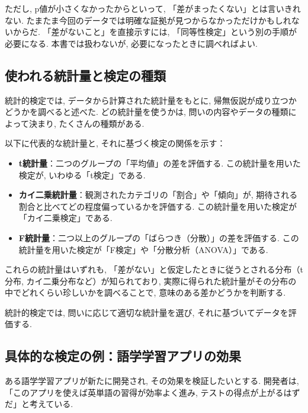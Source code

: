    ただし, p値が小さくなかったからといって, 「差がまったくない」とは言いきれない.
    たまたま今回のデータでは明確な証拠が見つからなかっただけかもしれないからだ.
    「差がないこと」を直接示すには, 「同等性検定」という別の手順が必要になる.
    本書では扱わないが, 必要になったときに調べればよい.


  \subsection{使われる統計量と検定の種類}

    統計的検定では, データから計算された統計量をもとに,
    帰無仮説が成り立つかどうかを調べると述べた.
    どの統計量を使うかは, 問いの内容やデータの種類によって決まり, たくさんの種類がある.

    以下に代表的な統計量と, それに基づく検定の関係を示す：

    \begin{itemize}
      \item \textbf{t統計量}：\quad 二つのグループの「平均値」の差を評価する.
        この統計量を用いた検定が, いわゆる「t検定」である.

      \item \textbf{カイ二乗統計量}：\quad 観測されたカテゴリの「割合」や「傾向」が,
        期待される割合と比べてどの程度偏っているかを評価する.
        この統計量を用いた検定が「カイ二乗検定」である.

      \item \textbf{F統計量}：\quad 二つ以上のグループの「ばらつき（分散）」の差を評価する.
        この統計量を用いた検定が「F検定」や「分散分析（ANOVA）」である.
    \end{itemize}

    これらの統計量はいずれも,
    「差がない」と仮定したときに従うとされる分布（t分布, カイ二乗分布など）が知られており,
    実際に得られた統計量がその分布の中でどれくらい珍しいかを調べることで,
    意味のある差かどうかを判断する.

    統計的検定では,
    問いに応じて適切な統計量を選び,
    それに基づいてデータを評価する.


  \subsection{具体的な検定の例：語学学習アプリの効果}
    ある語学学習アプリが新たに開発され, その効果を検証したいとする.
    開発者は, 「このアプリを使えば英単語の習得が効率よく進み, テストの得点が上がるはずだ」と考えている.

